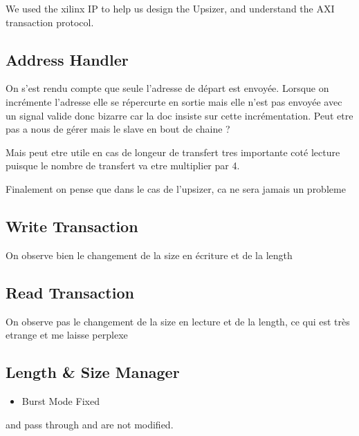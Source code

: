 We used the xilinx IP to help us design the Upsizer, and understand the AXI transaction protocol.

\subsection{Address Handler}

On s'est rendu compte que seule l'adresse de départ est envoyée. Lorsque on incrémente l'adresse elle se répercurte en sortie mais elle n'est pas envoyée avec un signal valide donc bizarre car la doc insiste sur cette incrémentation. Peut etre pas a nous de gérer mais le slave en bout de chaine ?

Mais peut etre utile en cas de longeur de transfert tres importante coté lecture puisque le nombre de transfert va etre multiplier par 4.

Finalement on pense que dans le cas de l'upsizer, ca ne sera jamais un probleme

\subsection{Write Transaction}

On observe bien le changement de la size en écriture et de la length

\subsection{Read Transaction}
On observe pas le changement de la size en lecture et de la length, ce qui est très etrange et me laisse perplexe


\newpage

\subsection{Length \& Size Manager}
\begin{itemize}
    \item Burst Mode Fixed
\end{itemize}
 and  pass through and are not modified. 

